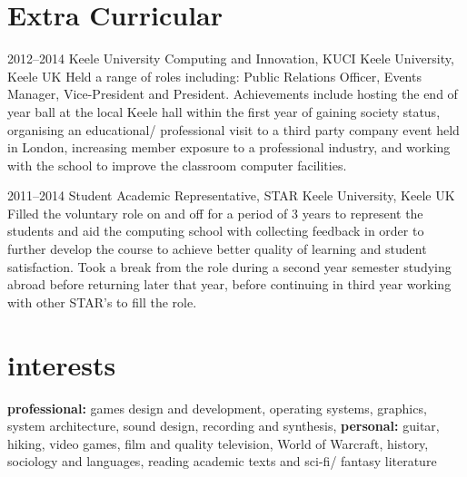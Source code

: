 \documentclass[]{friggeri-cv} %
\begin{document}

\section{Extra Curricular}

\begin{entrylist}


\entry
{2012--2014}
{Keele University Computing and Innovation, KUCI}
{Keele University, Keele UK}
{Held a range of roles including: Public Relations Officer, Events Manager,
Vice-President and President. Achievements include hosting the end of year
ball at the local Keele hall within the first year of gaining society status, organising
an educational/ professional visit to a third party company event
held in London, increasing member exposure to a professional industry, and
working with the school to improve the classroom computer facilities.}


\entry
{2011--2014}
{Student Academic Representative, STAR}
{Keele University, Keele UK}
{Filled the voluntary role on and off for a period of 3 years to represent the
students and aid the computing school with collecting feedback in order
to further develop the course to achieve better quality of learning and student
satisfaction. Took a break from the role during a second year semester
studying abroad before returning later that year, before continuing in third
year working with other STAR’s to fill the role.}


\end{entrylist}



\section{interests}

\textbf{professional:} games design and development, operating systems, graphics, system architecture, sound design, recording and synthesis, 
\textbf{personal:} guitar, hiking, video games, film and quality television, World of Warcraft, history, sociology and languages, reading academic texts and sci-fi/ fantasy literature
\end{document}
